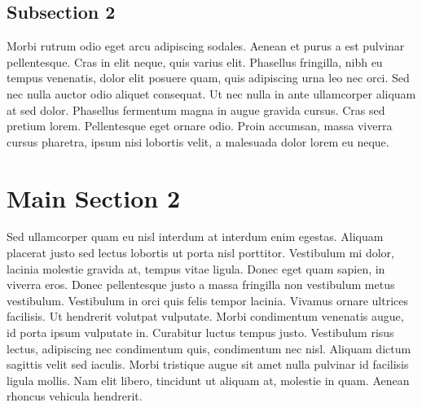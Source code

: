 
\subsection{Subsection 2}
Morbi rutrum odio eget arcu adipiscing sodales. Aenean et purus a est pulvinar pellentesque. Cras in elit neque, quis varius elit. Phasellus fringilla, nibh eu tempus venenatis, dolor elit posuere quam, quis adipiscing urna leo nec orci. Sed nec nulla auctor odio aliquet consequat. Ut nec nulla in ante ullamcorper aliquam at sed dolor. Phasellus fermentum magna in augue gravida cursus. Cras sed pretium lorem. Pellentesque eget ornare odio. Proin accumsan, massa viverra cursus pharetra, ipsum nisi lobortis velit, a malesuada dolor lorem eu neque.


\section{Main Section 2}

Sed ullamcorper quam eu nisl interdum at interdum enim egestas. Aliquam placerat justo sed lectus lobortis ut porta nisl porttitor. Vestibulum mi dolor, lacinia molestie gravida at, tempus vitae ligula. Donec eget quam sapien, in viverra eros. Donec pellentesque justo a massa fringilla non vestibulum metus vestibulum. Vestibulum in orci quis felis tempor lacinia. Vivamus ornare ultrices facilisis. Ut hendrerit volutpat vulputate. Morbi condimentum venenatis augue, id porta ipsum vulputate in. Curabitur luctus tempus justo. Vestibulum risus lectus, adipiscing nec condimentum quis, condimentum nec nisl. Aliquam dictum sagittis velit sed iaculis. Morbi tristique augue sit amet nulla pulvinar id facilisis ligula mollis. Nam elit libero, tincidunt ut aliquam at, molestie in quam. Aenean rhoncus vehicula hendrerit.
